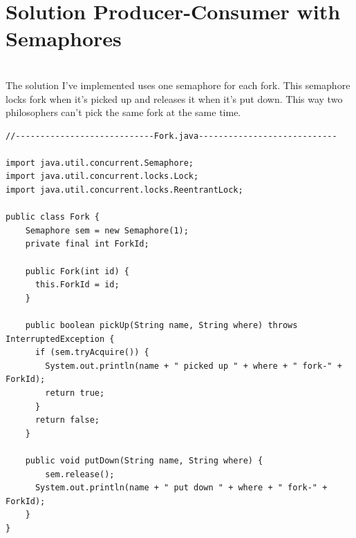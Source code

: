 \documentclass[14pt]{article}
\begin{document}
\section*{Solution Producer-Consumer with Semaphores}\\
The solution I've implemented uses one semaphore for each fork. This semaphore locks fork when it's picked up and releases it when it's put down. This way two philosophers can't pick the same fork at the same time.

\begin{lstlisting}
//----------------------------Fork.java----------------------------

import java.util.concurrent.Semaphore;
import java.util.concurrent.locks.Lock;
import java.util.concurrent.locks.ReentrantLock;

public class Fork {
	Semaphore sem = new Semaphore(1);
    private final int ForkId;

    public Fork(int id) {
      this.ForkId = id;
    }

    public boolean pickUp(String name, String where) throws InterruptedException {
      if (sem.tryAcquire()) {
        System.out.println(name + " picked up " + where + " fork-" + ForkId);
        return true;
      }
      return false;
    }

    public void putDown(String name, String where) {
    	sem.release();
      System.out.println(name + " put down " + where + " fork-" + ForkId);
    }
}


\end{lstlisting}

\vspace{5 mm}\\
\end{document}
